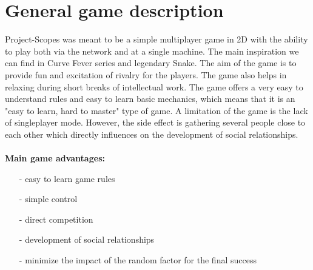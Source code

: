 \section{General game description}
\noindent Project-Scopes was meant to be a simple multiplayer game in 2D with the ability to play both via the network and at a single machine. The main inspiration we can find in Curve Fever series and legendary Snake. The aim of the game is to provide fun and excitation of rivalry for the players. The game also helps in relaxing during short breaks of intellectual work. The game offers a very easy to understand rules and easy to learn basic mechanics, which means that it is an "easy to learn, hard to master" type of game. A limitation of the game is the lack of singleplayer mode. However, the side effect is gathering several people close to each other which directly influences on the development of social relationships.
\\
\\
\noindent \textbf{Main game advantages:}
\begin{itemize}
	\item[-] easy to learn game rules
	\item[-] simple control
	\item[-] direct competition
	\item[-] development of social relationships
	\item[-] minimize the impact of the random factor for the final success
\end{itemize}